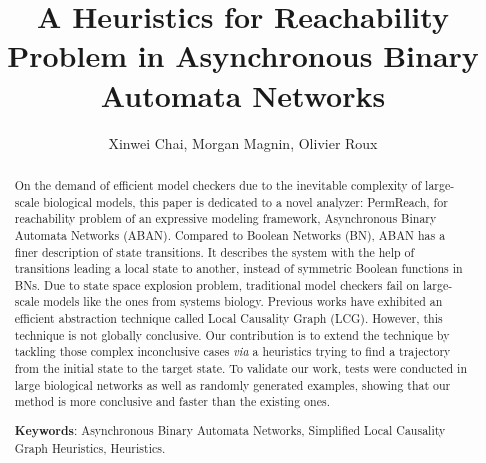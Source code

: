 \documentclass{article}
\theoremstyle{definition}
\begin{document}
\title{A Heuristics for Reachability Problem in Asynchronous Binary Automata Networks}
\author{Xinwei Chai, Morgan Magnin, Olivier Roux}
\date{}
\maketitle             
\begin{abstract}
On the demand of efficient model checkers due to the inevitable complexity of large-scale biological models, this paper is dedicated to a novel analyzer: PermReach, for reachability problem of an expressive modeling framework, Asynchronous Binary Automata Networks (ABAN). 
Compared to Boolean Networks (BN), ABAN has a finer description of state transitions. It describes the system with the help of transitions leading a local state to another, instead of symmetric Boolean functions in BNs. 
Due to state space explosion problem, traditional model checkers fail on large-scale models like the ones from systems biology.
Previous works have exhibited an efficient abstraction technique called Local Causality Graph (LCG).
However, this technique is not globally conclusive.
Our contribution is to extend the technique by tackling those complex inconclusive cases \textit{via} a heuristics trying to find a trajectory from the initial state to the target state. 
To validate our work, tests were conducted in large biological networks as well as randomly generated examples, showing that our method is more conclusive and faster than the existing ones.

\textbf{Keywords}: Asynchronous Binary Automata Networks, Simplified Local Causality Graph Heuristics, Heuristics.
\end{abstract}
\end{document}
